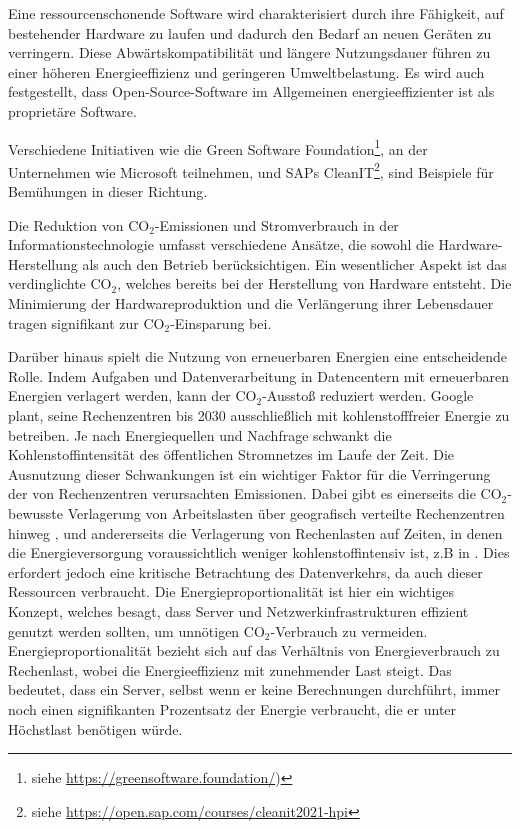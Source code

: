 \documentclass{article}
\begin{document}
Eine ressourcenschonende Software wird charakterisiert durch ihre Fähigkeit, auf bestehender Hardware zu laufen und dadurch den Bedarf an neuen Geräten zu verringern. Diese Abwärtskompatibilität und längere Nutzungsdauer führen zu einer höheren Energieeffizienz und geringeren Umweltbelastung. Es wird auch festgestellt, dass Open-Source-Software im Allgemeinen energieeffizienter ist als proprietäre Software.

Verschiedene Initiativen wie die Green Software Foundation\footnote{%
             siehe \href{https://greensoftware.foundation/}{https://greensoftware.foundation/})},%
an der Unternehmen wie Microsoft teilnehmen, und SAPs CleanIT\footnote{%
       siehe \href{https://open.sap.com/courses/cleanit2021-hpi}{https://open.sap.com/courses/cleanit2021-hpi}}, %
sind Beispiele für Bemühungen in dieser Richtung. 

Die Reduktion von CO$_2$-Emissionen und Stromverbrauch in der Informationstechnologie umfasst verschiedene Ansätze, die sowohl die Hardware-Herstellung als auch den Betrieb berücksichtigen. Ein wesentlicher Aspekt ist das verdinglichte CO$_2$, welches bereits bei der Herstellung von Hardware entsteht. Die Minimierung der Hardwareproduktion und die Verlängerung ihrer Lebensdauer tragen signifikant zur CO$_2$-Einsparung bei.

Darüber hinaus spielt die Nutzung von erneuerbaren Energien eine entscheidende Rolle. Indem Aufgaben und Datenverarbeitung in Datencentern mit erneuerbaren Energien verlagert werden, kann der CO$_2$-Ausstoß reduziert werden. Google plant, seine Rechenzentren bis 2030 ausschließlich mit kohlenstofffreier
Energie zu betreiben\cite{Google_2020}. 
Je nach Energiequellen und Nachfrage schwankt die Kohlenstoffintensität des öffentlichen Stromnetzes im Laufe der Zeit. Die Ausnutzung dieser Schwankungen ist ein wichtiger Faktor für die Verringerung der von Rechenzentren verursachten Emissionen. Dabei gibt es einerseits  die CO$_2$-bewusste Verlagerung von Arbeitslasten über geografisch verteilte Rechenzentren hinweg \cite{yang_carbon-neutralized_2022}, und andererseits  die  Verlagerung von Rechenlasten auf Zeiten, in denen die Energieversorgung voraussichtlich weniger kohlenstoffintensiv ist, z.B in  \cite{wiesner_lets_2021}.
Dies erfordert jedoch eine kritische Betrachtung des Datenverkehrs, da auch dieser Ressourcen verbraucht. Die Energieproportionalität \cite{abts_energy_2010, zheng_distributed_2022} ist hier ein wichtiges Konzept, welches besagt, dass Server und Netzwerkinfrastrukturen effizient genutzt werden sollten, um unnötigen CO$_2$-Verbrauch zu vermeiden. 
Energieproportionalität bezieht sich auf das Verhältnis von Energieverbrauch zu Rechenlast, wobei die Energieeffizienz mit zunehmender Last steigt. Das bedeutet, dass ein Server, selbst wenn er keine Berechnungen durchführt, immer noch einen signifikanten Prozentsatz der Energie verbraucht, die er unter Höchstlast benötigen würde.
\end{document}
